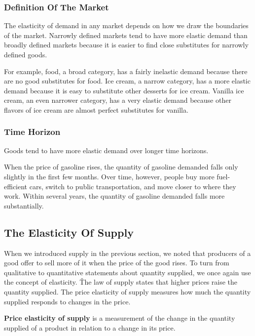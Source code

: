 \subsubsection*{Definition Of The Market}

The elasticity of demand in any market depends on how we draw the boundaries of the market. Narrowly defined markets
tend to have more elastic demand than broadly defined markets because it is easier to find close substitutes for
narrowly defined goods.

\be
For example, food, a broad category, has a fairly inelastic demand because there are no good substitutes for food.
Ice cream, a narrow category, has a more elastic demand because it is easy to substitute other desserts for ice cream.
Vanilla ice cream, an even narrower category, has a very elastic demand because other flavors of ice cream are almost
perfect substitutes for vanilla.
\ee

\subsubsection*{Time Horizon}

Goods tend to have more elastic demand over longer time horizons.

\be
When the price of gasoline rises, the quantity of gasoline demanded falls only slightly in the first few months. Over
time, however, people buy more fuel-efficient cars, switch to public transportation, and move closer to where they
work. Within several years, the quantity of gasoline demanded falls more substantially.
\ee

\subsection{The Elasticity Of Supply}

When we introduced supply in the previous section, we noted that producers of a good offer to sell more of it when
the price of the good rises. To turn from qualitative to quantitative statements about quantity supplied, we once
again use the concept of elasticity. \v

The law of supply states that higher prices raise the quantity supplied. The price elasticity of supply measures how
much the quantity supplied responds to changes in the price.

\textbf{Price elasticity of supply} is a measurement of the change in the quantity supplied of a product in relation to
a change in its price.

